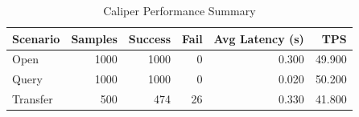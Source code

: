 \begin{table}
\caption{Caliper Performance Summary}
\label{tab:caliper_round}
\begin{tabular}{lrrrrr}
\toprule
Scenario & Samples & Success & Fail & Avg Latency (s) & TPS \\
\midrule
Open & 1000 & 1000 & 0 & 0.300 & 49.900 \\
Query & 1000 & 1000 & 0 & 0.020 & 50.200 \\
Transfer & 500 & 474 & 26 & 0.330 & 41.800 \\
\bottomrule
\end{tabular}
\end{table}
